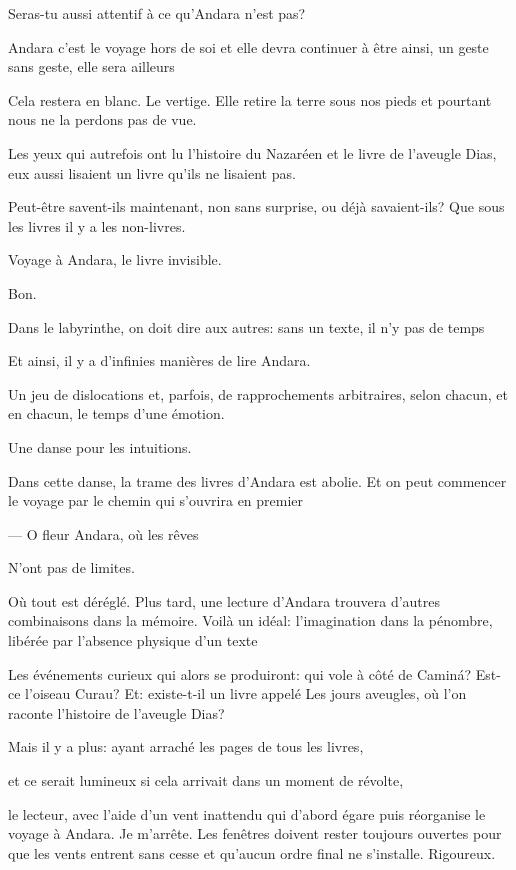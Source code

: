 Seras-tu aussi attentif à ce qu'Andara n'est pas?

Andara c'est le voyage hors de soi et elle devra continuer à être ainsi,
un geste sans geste, elle sera ailleurs

Cela restera en blanc. Le vertige. Elle retire la terre sous nos pieds
et pourtant nous ne la perdons pas de vue.

Les yeux qui autrefois ont lu l'histoire du Nazaréen et le livre de
l'aveugle Dias, eux aussi lisaient un livre qu'ils ne lisaient pas.

Peut-être savent-ils maintenant, non sans surprise, ou déjà
savaient-ils? Que sous les livres il y a les non-livres.

Voyage à Andara, le livre invisible.

\pagebreak

\vspace*{4cm}

Bon.

Dans le labyrinthe, on doit dire aux autres: sans un texte, il n'y pas
de temps

Et ainsi, il y a d'infinies manières de lire Andara.

Un jeu de dislocations et, parfois, de rapprochements arbitraires, selon
chacun, et en chacun, le temps d'une émotion.

Une danse pour les intuitions.

\pagebreak

\vspace*{4cm}

Dans cette danse, la trame des livres d'Andara est abolie. Et on peut
commencer le voyage par le chemin qui s'ouvrira en premier

--- O fleur Andara, où les rêves

N'ont pas de limites.

Où tout est déréglé. Plus tard, une lecture d'Andara trouvera d'autres
combinaisons dans la mémoire. Voilà un idéal: l'imagination dans la
pénombre, libérée par l'absence physique d'un texte

Les événements curieux qui alors se produiront: qui vole à côté de
Caminá? Est-ce l'oiseau Curau? Et: existe-t-il un livre appelé Les
jours aveugles, où l'on raconte l'histoire de l'aveugle Dias?

Mais il y a plus: ayant arraché les pages de tous les livres,

et ce serait lumineux si cela arrivait dans un moment de révolte,

le lecteur, avec l'aide d'un vent inattendu qui d'abord égare puis
réorganise le voyage à Andara. Je m'arrête. Les fenêtres doivent rester
toujours ouvertes pour que les vents entrent sans cesse et qu'aucun
ordre final ne s'installe. Rigoureux.

